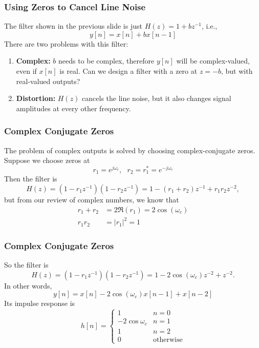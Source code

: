 \documentclass{beamer}
\begin{document}
\begin{frame}
  \frametitle{Using Zeros to Cancel Line Noise}
  The filter shown in the previous slide is just $H(z)=1+bz^{-1}$, i.e.,
  \begin{displaymath}
    y[n] = x[n] + bx[n-1]
  \end{displaymath}
  There are two problems with this filter:
  \begin{enumerate}
  \item {\bf Complex:} $b$ needs to be complex, therefore $y[n]$ will
    be complex-valued, even if $x[n]$ is real.  Can we design a filter
    with a zero at $z=-b$, but with real-valued outputs?
  \item {\bf Distortion:} $H(z)$ cancels the line noise, but it also
    changes signal amplitudes at every other frequency.
  \end{enumerate}
\end{frame}

\begin{frame}
  \frametitle{Complex Conjugate Zeros}

  The problem of complex outputs is solved by choosing
  complex-conjugate zeros.  Suppose we choose zeros at
  \begin{displaymath}
    r_1 = e^{j\omega_c},~~~r_2=r_1^*=e^{-j\omega_c}
  \end{displaymath}
  Then the filter is
  \begin{displaymath}
    H(z) = (1-r_1z^{-1})(1-r_2z^{-1}) = 1-(r_1+r_2)z^{-1} + r_1r_2z^{-2},
  \end{displaymath}
  but from our review of complex numbers, we know that
  \begin{align*}
    r_1+r_2 &= 2\Re(r_1) = 2\cos(\omega_c)\\
    r_1r_2 &= |r_1|^2 = 1
  \end{align*}
\end{frame}

\begin{frame}
  \frametitle{Complex Conjugate Zeros}
  
  So the filter is 
  \begin{displaymath}
    H(z) = (1-r_1z^{-1})(1-r_2z^{-1}) = 1-2\cos(\omega_c) z^{-2} + z^{-2}.
  \end{displaymath}
  In other words,
  \begin{displaymath}
    y[n] = x[n] - 2\cos(\omega_c)x[n-1] + x[n-2]
  \end{displaymath}
  Its impulse response is
  \begin{displaymath}
    h[n]=\begin{cases}
    1 & n=0\\
    -2\cos\omega_c & n=1\\
    1 & n=2\\
    0 & \mbox{otherwise}
    \end{cases}
  \end{displaymath}
\end{frame}
\end{document}
